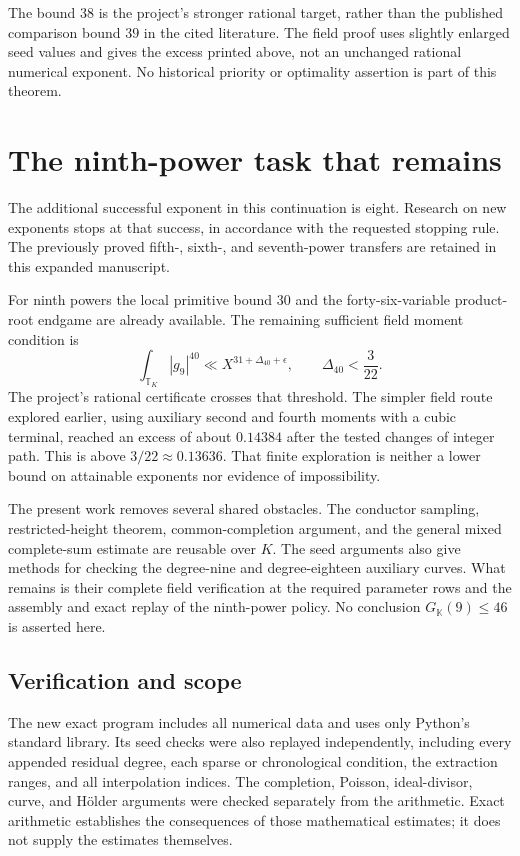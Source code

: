 \documentclass[11pt,reqno]{amsart}
\numberwithin{equation}{section}
\theoremstyle{definition}
\begin{document}
The bound $38$ is the project's stronger rational target, rather than
the published comparison bound $39$ in the cited literature. The field
proof uses slightly enlarged seed values and gives the excess printed
above, not an unchanged rational numerical exponent. No historical
priority or optimality assertion is part of this theorem.



\section{The ninth-power task that remains}
\label{sec:remaining-continuation}

The additional successful exponent in this continuation is eight.
Research on new exponents stops at that success, in accordance with
the requested stopping rule. The previously proved fifth-, sixth-,
and seventh-power transfers are retained in this expanded manuscript.

For ninth powers the local primitive bound $30$ and the forty-six-variable
product-root endgame are already available. The remaining sufficient
field moment condition is
\[
 \int_{\mathbb T_K}|g_9|^{40}
       \ll X^{31+\Delta_{40}+\epsilon},
 \qquad \Delta_{40}<\frac3{22}.
\]
The project's rational certificate crosses that threshold. The simpler
field route explored earlier, using auxiliary second and fourth moments
with a cubic terminal, reached an excess of about $0.14384$ after the
tested changes of integer path. This is above $3/22\approx0.13636$.
That finite exploration is neither a lower bound on attainable exponents
nor evidence of impossibility.

The present work removes several shared obstacles. The conductor sampling,
restricted-height theorem, common-completion argument, and the general
mixed complete-sum estimate are reusable over $K$. The seed arguments
also give methods for checking the degree-nine and degree-eighteen
auxiliary curves. What remains is their complete field verification
at the required parameter rows and the assembly and exact replay of the
ninth-power policy. No conclusion $G_{\mathbb K}(9)\le46$ is asserted here.

\subsection{Verification and scope}

The new exact program includes all numerical data and uses only Python's
standard library. Its seed checks were also replayed independently,
including every appended residual degree, each sparse or chronological
condition, the extraction ranges, and all interpolation indices.
The completion, Poisson, ideal-divisor, curve, and H\"older arguments
were checked separately from the arithmetic. Exact arithmetic establishes
the consequences of those mathematical estimates; it does not supply
the estimates themselves.
\end{document}
